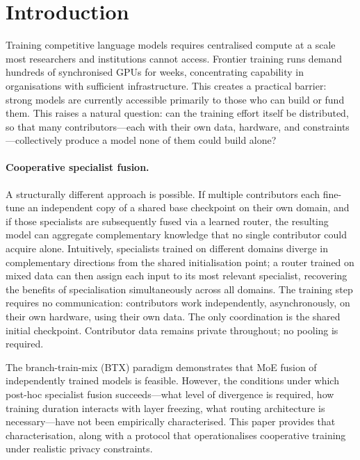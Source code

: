 \documentclass{article}
\begin{document}
\section{Introduction}
\label{sec:intro}

Training competitive language models requires centralised compute at a scale most researchers and institutions cannot access. Frontier training runs demand hundreds of synchronised GPUs for weeks, concentrating capability in organisations with sufficient infrastructure. This creates a practical barrier: strong models are currently accessible primarily to those who can build or fund them. This raises a natural question: can the training effort itself be distributed, so that many contributors---each with their own data, hardware, and constraints---collectively produce a model none of them could build alone?

\paragraph{Cooperative specialist fusion.} A structurally different approach is possible. If multiple contributors each fine-tune an independent copy of a shared base checkpoint on their own domain, and if those specialists are subsequently fused via a learned router, the resulting model can aggregate complementary knowledge that no single contributor could acquire alone. Intuitively, specialists trained on different domains diverge in complementary directions from the shared initialisation point; a router trained on mixed data can then assign each input to its most relevant specialist, recovering the benefits of specialisation simultaneously across all domains. The training step requires no communication: contributors work independently, asynchronously, on their own hardware, using their own data. The only coordination is the shared initial checkpoint. Contributor data remains private throughout; no pooling is required.

The branch-train-mix (BTX) paradigm \citep{sukhbaatar2024branchtrainmix} demonstrates that MoE fusion of independently trained models is feasible. However, the conditions under which post-hoc specialist fusion succeeds---what level of divergence is required, how training duration interacts with layer freezing, what routing architecture is necessary---have not been empirically characterised. This paper provides that characterisation, along with a protocol that operationalises cooperative training under realistic privacy constraints.
\end{document}
